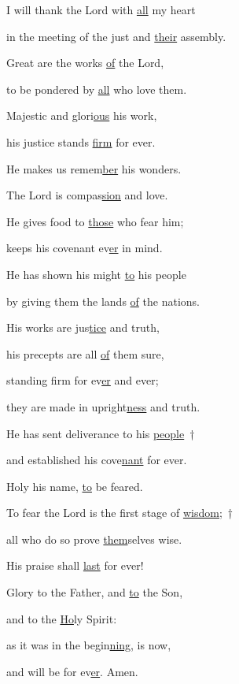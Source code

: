 \noindent I will thank the Lord with \uline{all} my heart ~\GreStar{}~\nopagebreak

in the meeting of the just and \uline{their} assembly.

\noindent Great are the works \uline{of} the Lord, ~\GreStar{}~\nopagebreak

to be pondered by \uline{all} who love them.



\noindent Majestic and glori\uline{ous} his work, ~\GreStar{}~\nopagebreak

his justice stands \uline{firm} for ever.

\noindent He makes us remem\uline{ber} his wonders. ~\GreStar{}~\nopagebreak

The Lord is compas\uline{sion} and love.



\noindent He gives food to \uline{those} who fear him; ~\GreStar{}~\nopagebreak

keeps his covenant ev\uline{er} in mind.

\noindent He has shown his might \uline{to} his people ~\GreStar{}~\nopagebreak

by giving them the lands \uline{of} the nations.



\noindent His works are jus\uline{tice} and truth, ~\GreStar{}~\nopagebreak

his precepts are all \uline{of} them sure,

\noindent standing firm for ev\uline{er} and ever; ~\GreStar{}~\nopagebreak

they are made in upright\uline{ness} and truth.



\noindent He has sent deliverance to his \uline{people}~†~\nopagebreak

and established his cove\uline{nant} for ever. ~\GreStar{}~\nopagebreak

Holy his name, \uline{to} be feared.



\noindent To fear the Lord is the first stage of \uline{wisdom;}~†~\nopagebreak

all who do so prove \uline{them}selves wise. ~\GreStar{}~\nopagebreak

His praise shall \uline{last} for ever!



\noindent Glory to the Father, and \uline{to} the Son,~\GreStar{}~\nopagebreak

and to the \uline{Ho}ly Spirit:

\noindent as it was in the begin\uline{ning}, is now,~\GreStar{}~\nopagebreak

and will be for ev\uline{er}. Amen.

